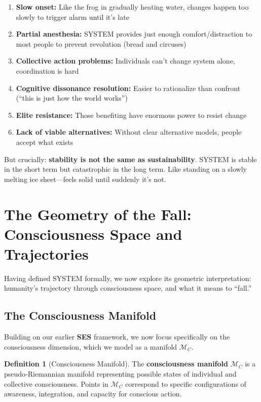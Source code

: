 \documentclass[11pt,a4paper]{article}
\newcommand{\SES}{\textbf{SES}}
\theoremstyle{definition}
\newtheorem{definition}{Definition}[section]
\theoremstyle{remark}
\begin{document}
\begin{enumerate}
    \item \textbf{Slow onset:} Like the frog in gradually heating water, changes happen too slowly to trigger alarm until it's late
    
    \item \textbf{Partial anesthesia:} SYSTEM provides just enough comfort/distraction to most people to prevent revolution (bread and circuses)
    
    \item \textbf{Collective action problems:} Individuals can't change system alone, coordination is hard
    
    \item \textbf{Cognitive dissonance resolution:} Easier to rationalize than confront (``this is just how the world works'')
    
    \item \textbf{Elite resistance:} Those benefiting have enormous power to resist change
    
    \item \textbf{Lack of viable alternatives:} Without clear alternative models, people accept what exists
\end{enumerate}

But crucially: \textbf{stability is not the same as sustainability}. SYSTEM is stable in the short term but catastrophic in the long term. Like standing on a slowly melting ice sheet---feels solid until suddenly it's not.

\section{The Geometry of the Fall: Consciousness Space and Trajectories}

Having defined SYSTEM formally, we now explore its geometric interpretation: humanity's trajectory through consciousness space, and what it means to ``fall.''

\subsection{The Consciousness Manifold}

Building on our earlier \SES{} framework, we now focus specifically on the consciousness dimension, which we model as a manifold $\mathcal{M}_C$.

\begin{definition}[Consciousness Manifold]\label{def:consciousness_manifold}
The \textbf{consciousness manifold} $\mathcal{M}_C$ is a pseudo-Riemannian manifold representing possible states of individual and collective consciousness. Points in $\mathcal{M}_C$ correspond to specific configurations of awareness, integration, and capacity for conscious action.
\end{definition}
\end{document}
